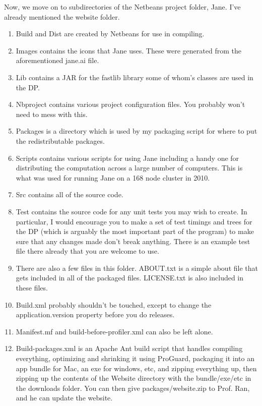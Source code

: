 \documentclass{article}
\begin{document}
Now, we move on to subdirectories of the Netbeans project folder, Jane. I've already mentioned the website folder.
\begin{enumerate}
\item Build and Dist are created by Netbeans for use in compiling.

\item Images contains the icons that Jane uses. These were generated from the aforementioned jane.ai file.

\item Lib contains a JAR for the fastlib library some of whom's classes are used in the DP.

\item Nbproject contains various project configuration files. You probably won't need to mess with this.

\item Packages is a directory which is used by my packaging script for where to put the redistributable packages.

\item Scripts contains various scripts for using Jane including a handy one for distributing the computation across a large number of computers. This is what was used for running Jane on a 168 node cluster in 2010.

\item Src contains all of the source code.

\item Test contains the source code for any unit tests you may wish to  create. In particular, I would encourage you to make a set of test timings and trees for the DP (which is arguably the most important part of the program) to make sure that any changes made don't break anything. There is an example test file there already that you are welcome to use.

\item There are also a few files in this folder. ABOUT.txt is a simple about file that gets included in all of the packaged files. LICENSE.txt is also included in these files.

\item Build.xml probably shouldn't be touched, except to change the application.version property before you do releases.

\item Manifest.mf and build-before-profiler.xml can also be left alone.

\item Build-packages.xml is an Apache Ant build script that handles compiling everything, optimizing and shrinking it using ProGuard, packaging it into an app bundle for Mac, an exe for windows, etc, and zipping everything up, then zipping up the contents of the Website directory with the bundle/exe/etc in the downloads folder. You can then give packages/website.zip to Prof. Ran, and he can update the website.
\end{enumerate}
\end{document}
